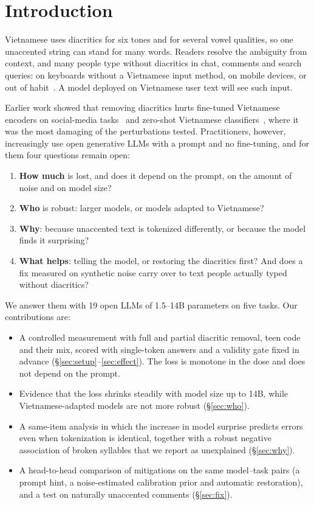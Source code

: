 \documentclass[conference]{IEEEtran}
\begin{document}
\section{Introduction}

Vietnamese uses diacritics for six tones and for several vowel qualities, so one unaccented string can stand for many words. Readers resolve the ambiguity from context, and many people type without diacritics in chat, comments and search queries: on keyboards without a Vietnamese input method, on mobile devices, or out of habit~\cite{naplava2018diacritics,nguyen2023visobert}. A model deployed on Vietnamese user text will see such input.

Earlier work showed that removing diacritics hurts fine-tuned Vietnamese encoders on social-media tasks~\cite{nguyen2023visobert} and zero-shot Vietnamese classifiers~\cite{ha2026decision}, where it was the most damaging of the perturbations tested. Practitioners, however, increasingly use open generative LLMs with a prompt and no fine-tuning, and for them four questions remain open:
\begin{enumerate}
\item \textbf{How much} is lost, and does it depend on the prompt, on the amount of noise and on model size?
\item \textbf{Who} is robust: larger models, or models adapted to Vietnamese?
\item \textbf{Why}: because unaccented text is tokenized differently, or because the model finds it surprising?
\item \textbf{What helps}: telling the model, or restoring the diacritics first? And does a fix measured on synthetic noise carry over to text people actually typed without diacritics?
\end{enumerate}

We answer them with 19 open LLMs of 1.5--14B parameters on five tasks. Our contributions are:
\begin{itemize}
\item A controlled measurement with full and partial diacritic removal, teen code and their mix, scored with single-token answers and a validity gate fixed in advance (\S\ref{sec:setup}--\ref{sec:effect}). The loss is monotone in the dose and does not depend on the prompt.
\item Evidence that the loss shrinks steadily with model size up to 14B, while Vietnamese-adapted models are not more robust (\S\ref{sec:who}).
\item A same-item analysis in which the increase in model surprise predicts errors even when tokenization is identical, together with a robust negative association of broken syllables that we report as unexplained (\S\ref{sec:why}).
\item A head-to-head comparison of mitigations on the same model--task pairs (a prompt hint, a noise-estimated calibration prior and automatic restoration), and a test on naturally unaccented comments (\S\ref{sec:fix}).
\end{itemize}
\end{document}
